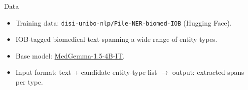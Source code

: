 \begin{frame}{Data}
  \begin{itemize}
    \item Training data: \texttt{disi-unibo-nlp/Pile-NER-biomed-IOB} (Hugging Face).
    \item IOB-tagged biomedical text spanning a wide range of entity types.
    \item Base model: \href{https://huggingface.co/google/medgemma-1.5-4b-it}{MedGemma-1.5-4B-IT}.
    \item Input format: text + candidate entity-type list $\rightarrow$ output: extracted spans per type.
  \end{itemize}
\end{frame}
